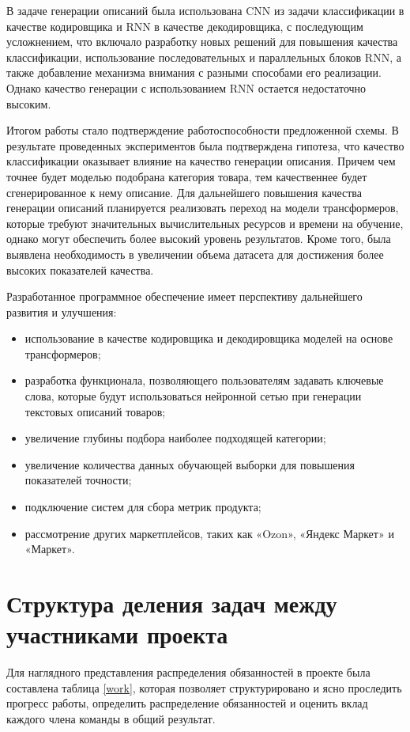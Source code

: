 \documentclass[a4paper,12pt]{extarticle}
\begin{document}
В задаче генерации описаний была использована CNN из задачи классификации в качестве кодировщика и RNN в качестве декодировщика, с последующим усложнением, что включало разработку новых решений для повышения качества классификации, использование последовательных и параллельных блоков RNN, а также добавление механизма внимания с разными способами его реализации. Однако качество генерации с использованием RNN остается недостаточно высоким.

Итогом работы стало подтверждение работоспособности предложенной схемы. В результате проведенных экспериментов была подтверждена гипотеза, что качество классификации оказывает влияние на качество генерации описания. Причем чем точнее будет моделью подобрана категория товара, тем качественнее будет сгенерированное к нему описание. Для дальнейшего повышения качества генерации описаний планируется реализовать переход на модели трансформеров, которые требуют значительных вычислительных ресурсов и времени на обучение, однако могут обеспечить более высокий уровень результатов. Кроме того, была выявлена необходимость в увеличении объема датасета для достижения более высоких показателей качества.

Разработанное программное обеспечение имеет перспективу дальнейшего развития и улучшения:
\begin{itemize}
	\item использование в качестве кодировщика и декодировщика моделей на основе трансформеров;
	\item разработка функционала, позволяющего пользователям задавать ключевые слова, которые будут использоваться нейронной сетью при генерации текстовых описаний товаров;
	\item увеличение глубины подбора наиболее подходящей категории;
	\item увеличение количества данных обучающей выборки для повышения показателей точности;
	\item подключение систем для сбора метрик продукта;
	\item рассмотрение других маркетплейсов, таких как «Ozon», «Яндекс Маркет» и «Маркет».
\end{itemize}

\newpage
\section*{Структура деления задач между участниками проекта}

Для наглядного представления распределения обязанностей в проекте была составлена таблица \ref{work}, которая позволяет структурировано и ясно проследить прогресс работы, определить распределение обязанностей и оценить вклад каждого члена команды в общий результат.
\end{document}
